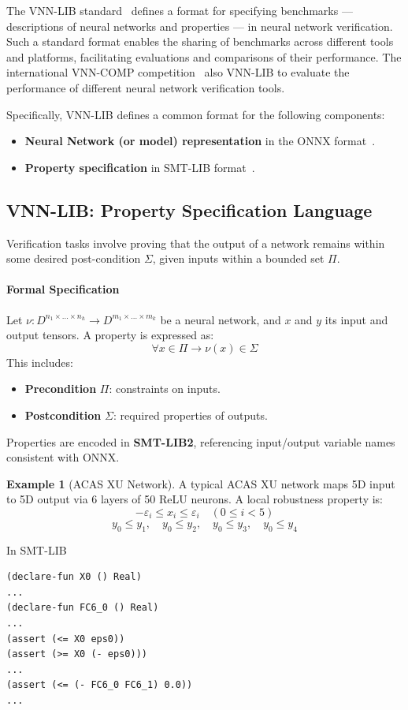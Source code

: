 \documentclass[oneside,11pt,dvipsnames]{book}
\numberwithin{equation}{section}
\theoremstyle{definition}
\newtheorem{example}{Example}[section]
\theoremstyle{remark}
\newcommand{\tvn}[1]{\iftoggle{usecomment}{{\color{red}{[TVN]: #1}}}{}}
\newcommand{\hd}[1]{\iftoggle{usecomment}{{\color{blue}{[HD]: #1}}}{}}
\begin{document}
The VNN-LIB standard~\cite{demarchi2023supporting,vnnlib} defines a format for specifying benchmarks --- descriptions of neural networks and properties --- in neural network verification. Such a standard format enables the sharing of benchmarks across different tools and platforms, facilitating evaluations and comparisons of their performance. The international VNN-COMP competition~\cite{brix2024fifth} also VNN-LIB to evaluate the performance of different neural network verification tools.


Specifically, VNN-LIB defines a common format for the following components:
\begin{itemize}
    \item \textbf{Neural Network (or model) representation} in the ONNX format~\cite{onnx}.
    \item \textbf{Property specification} in SMT-LIB format~\cite{barrett2010smt}.
\end{itemize}



\subsection{VNN-LIB: Property Specification Language}

Verification tasks involve proving that the output of a network remains within some desired post-condition $\Sigma$, given inputs within a bounded set $\Pi$.

\paragraph{Formal Specification}
Let $\nu: D^{n_1 \times \dots \times n_h} \to D^{m_1 \times \dots \times m_k}$ be a neural network, and $x$ and $y$ its input and output tensors. A property is expressed as:
\[
\forall x \in \Pi \rightarrow \nu(x) \in \Sigma
\]
This includes:
\begin{itemize}
    \item \textbf{Precondition} $\Pi$: constraints on inputs.
    \item \textbf{Postcondition} $\Sigma$: required properties of outputs.
\end{itemize}

Properties are encoded in \textbf{SMT-LIB2}, referencing input/output variable names consistent with ONNX.


\begin{example}[ACAS XU Network]

A typical ACAS XU network maps 5D input to 5D output via 6 layers of 50 ReLU neurons. A local robustness property is:
\[
-\varepsilon_i \leq x_i \leq \varepsilon_i \quad (0 \leq i < 5)
\]
\[
y_0 \leq y_1, \quad y_0 \leq y_2, \quad y_0 \leq y_3, \quad y_0 \leq y_4
\]

In SMT-LIB\tvn{is this also the VNN-LIB code? If not, add the VNN-LIB code}\hd{not VNNLIB}
\begin{lstlisting}[basicstyle=\ttfamily\scriptsize]
(declare-fun X0 () Real)
...
(declare-fun FC6_0 () Real)
...
(assert (<= X0 eps0))
(assert (>= X0 (- eps0)))
...
(assert (<= (- FC6_0 FC6_1) 0.0))
...
\end{lstlisting}
\end{example}
\end{document}
